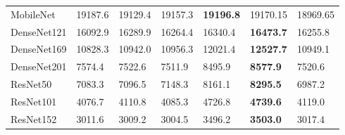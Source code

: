 \begin{table}
\begin{tabular}{lllllll}
    MobileNet   &    19187.6 &    19129.4   &    19157.3 &    \textbf{19196.8} &    19170.15 &    18969.65 \\
    DenseNet121 & 16092.9   & 16289.9      & 16264.4 & 16340.4 & \textbf{16473.7} & 16255.8 \\
    DenseNet169 & 10828.3   & 10942.0        & 10956.3 & 12021.4 & \textbf{12527.7} & 10949.1 \\
    DenseNet201 & 7574.4    & 7522.6       & 7511.9  & 8495.9  & \textbf{8577.9}  & 7520.6  \\
    ResNet50    & 7083.3    & 7096.5       & 7148.3  & 8161.1  & \textbf{8295.5}  & 6987.2  \\
    ResNet101   & 4076.7    & 4110.8       & 4085.3  & 4726.8  & \textbf{4739.6}  & 4119.0    \\
    ResNet152   & 3011.6    & 3009.2       & 3004.5  & 3496.2  & \textbf{3503.0}    & 3017.4  \\
    \end{tabular}
    \label{tbl:pap_hvd_narval_full}
\end{table}